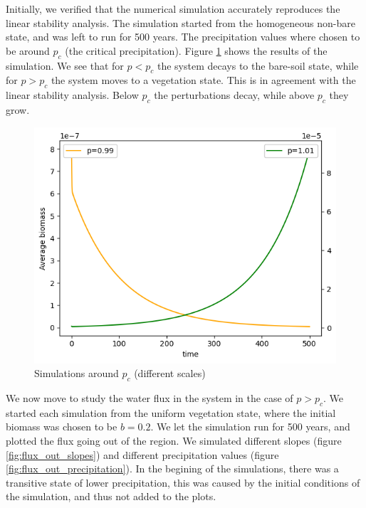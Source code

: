 \documentclass{article}
\numberwithin{equation}{section}
\begin{document}
Initially, we verified that the numerical simulation accurately reproduces the linear stability analysis. The simulation started from the homogeneous non-bare state, and was left to run for 500 years. The precipitation values where chosen to be around $p_c$ (the critical precipitation). Figure \ref{fig:critical_point} shows the results of the simulation. We see that for $p<p_c$ the system decays to the bare-soil state, while for $p>p_c$ the system moves to a vegetation state. This is in agreement with the linear stability analysis. Below $p_c$ the perturbations decay, while above $p_c$ they grow.
\begin{figure}[!ht]
    \centering
    \includegraphics[scale=0.5]{plots/critical point.png}
    \caption{Simulations around $p_c$ (different scales)}
    \label{fig:critical_point}
\end{figure}

We now move to study the water flux in the system in the case of $p>p_c$.
We started each simulation from the uniform vegetation state, where the initial biomass was chosen to be $b=0.2$.
We let the simulation run for 500 years, and plotted the flux going out of the region.
We simulated different slopes (figure \ref{fig:flux_out_slopes}) and different precipitation values (figure \ref{fig:flux_out_precipitation}).
In the begining of the simulations, there was a transitive state of lower precipitation, this was caused by the initial conditions of the simulation, and thus not added to the plots.
\end{document}
